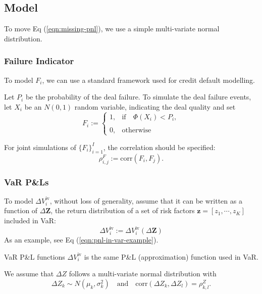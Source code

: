 \documentclass[10pt,a4paper]{article}
\newcommand{\inVaR}{{\mathrm{iv}}}
\begin{document}
\subsection{Model}

To move Eq (\ref{eqn:missing-pnl}), we use a simple multi-variate normal distribution.

\subsubsection{Failure Indicator}
To model $F_i$, we can use a standard framework used for credit default modelling. 

Let $P_i$ be the probability of the deal failure. To simulate the deal failure events, let $X_i$ be an $N(0,1)$ random variable, indicating the deal quality and set
\begin{equation}
F_i := \left\{
\begin{array}{cl}
1, & \textrm{if}\quad \Phi(X_i) < P_i,\\
\\
0, & \textrm{otherwise} 
\end{array}
\right.
\end{equation}

For joint simulations of $\{F_i\}_{i=1}^{I}$, the correlation should be specified:
\begin{equation} 
\rho^F_{i,j} := \mathrm{corr}(F_i, F_j).
\end{equation}



\subsubsection{VaR P\&Ls}

To model $\Delta V_i^\inVaR$, without loss of generality, assume that it can be written as a function of $\Delta \bm{Z}$, the return distribution of a set of risk factors $\bm{z} = [z_1, \cdots, z_K]$ included in VaR:
\begin{equation}
\Delta V_i^\inVaR := \Delta V_i^\inVaR(\Delta \bm{Z})
\end{equation}
As an example, see Eq (\ref{eqn:pnl-in-var-example}). 

\begin{MyRemark}{VaR P\&L functions}{}
$\Delta V_i^\inVaR$ is the same P\&L (approximation) function used in VaR.
\end{MyRemark}

We assume that $\Delta Z$ follows a multi-variate normal distribution with
\begin{equation}
\Delta Z_k \sim N(\mu_k, \sigma_k^2) \quad \textrm{and} \quad \mathrm{corr}(\Delta Z_k, \Delta Z_l) = \rho_{k,l}^{Z}.
\end{equation}
\end{document}

